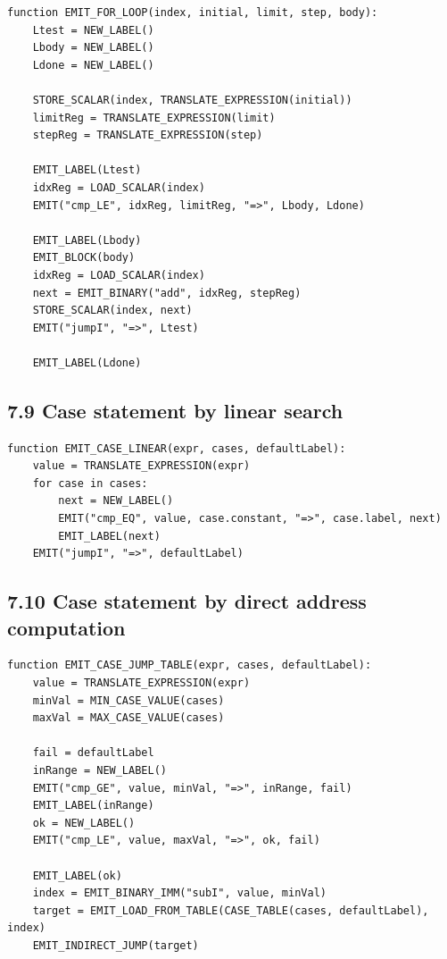 \documentclass[10pt,letterpaper]{article}
\begin{document}
\begin{verbatim}
function EMIT_FOR_LOOP(index, initial, limit, step, body):
    Ltest = NEW_LABEL()
    Lbody = NEW_LABEL()
    Ldone = NEW_LABEL()

    STORE_SCALAR(index, TRANSLATE_EXPRESSION(initial))
    limitReg = TRANSLATE_EXPRESSION(limit)
    stepReg = TRANSLATE_EXPRESSION(step)

    EMIT_LABEL(Ltest)
    idxReg = LOAD_SCALAR(index)
    EMIT("cmp_LE", idxReg, limitReg, "=>", Lbody, Ldone)

    EMIT_LABEL(Lbody)
    EMIT_BLOCK(body)
    idxReg = LOAD_SCALAR(index)
    next = EMIT_BINARY("add", idxReg, stepReg)
    STORE_SCALAR(index, next)
    EMIT("jumpI", "=>", Ltest)

    EMIT_LABEL(Ldone)
\end{verbatim}

\subsection*{7.9 Case statement by linear search}
{}

\begin{verbatim}
function EMIT_CASE_LINEAR(expr, cases, defaultLabel):
    value = TRANSLATE_EXPRESSION(expr)
    for case in cases:
        next = NEW_LABEL()
        EMIT("cmp_EQ", value, case.constant, "=>", case.label, next)
        EMIT_LABEL(next)
    EMIT("jumpI", "=>", defaultLabel)
\end{verbatim}

\subsection*{7.10 Case statement by direct address computation}
{}

\begin{verbatim}
function EMIT_CASE_JUMP_TABLE(expr, cases, defaultLabel):
    value = TRANSLATE_EXPRESSION(expr)
    minVal = MIN_CASE_VALUE(cases)
    maxVal = MAX_CASE_VALUE(cases)

    fail = defaultLabel
    inRange = NEW_LABEL()
    EMIT("cmp_GE", value, minVal, "=>", inRange, fail)
    EMIT_LABEL(inRange)
    ok = NEW_LABEL()
    EMIT("cmp_LE", value, maxVal, "=>", ok, fail)

    EMIT_LABEL(ok)
    index = EMIT_BINARY_IMM("subI", value, minVal)
    target = EMIT_LOAD_FROM_TABLE(CASE_TABLE(cases, defaultLabel), index)
    EMIT_INDIRECT_JUMP(target)
\end{verbatim}
\end{document}
